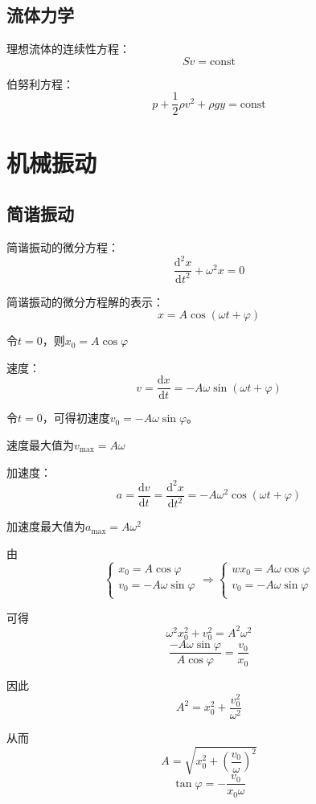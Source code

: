 \documentclass[12pt, a4paper, twoside]{ctexbook}
\begin{document}
\section{流体力学}
{\sonti 理想流体的连续性方程}：
$$
Sv=\mathrm{const}
$$

{\sonti 伯努利方程}：
$$
p+\frac{1}{2}\rho v^2+\rho gy=\mathrm{const}
$$
\chapter{机械振动}
\newpage
\section{简谐振动}
{\sonti 简谐振动的微分方程}：
$$
\frac{\mathrm{d}^2x}{\mathrm{d}t^2}+\omega^2 x=0
$$

{\sonti 简谐振动的微分方程解的表示}：
$$
x=A\cos\left(\omega t+\varphi\right)
$$

令$t=0$，则$x_0=A\cos\varphi$

{\sonti 速度}：
$$
v=\frac{\mathrm{d}x}{\mathrm{d}t}=-A\omega\sin\left(\omega t+\varphi\right)
$$

令$t=0$，可得初速度$v_0=-A\omega\sin\varphi$。

速度最大值为$v_{\max}=A\omega$

{\sonti 加速度}：
$$
a=\frac{\mathrm{d}v}{\mathrm{d}t}=\frac{\mathrm{d}^2x}{\mathrm{d}t^2}=-A\omega^2\cos\left(\omega t+\varphi\right)
$$

加速度最大值为$a_{\max}=A\omega^2$

由
$$
\left\{ \begin{array}{l}
	x_0=A\cos \varphi\\
	v_0=-A\omega \sin \varphi\\
\end{array} \right. \Rightarrow \left\{ \begin{array}{l}
	wx_0=A\omega \cos \varphi\\
	v_0=-A\omega \sin \varphi\\
\end{array} \right. 
$$

可得
$$
\omega^2x_0^2+v_0^2=A^2\omega^2
$$
$$
\frac{-A\omega\sin\varphi}{A\cos\varphi}=\frac{v_0}{x_0}
$$

因此
$$
A^2=x_0^2+\frac{v_0^2}{\omega^2}
$$

从而
$$
A=\sqrt{x_0^2+\left(\frac{v_0}{\omega}\right)^2}
$$
$$
\tan\varphi=-\frac{v_0}{x_0\omega}
$$
\end{document}
